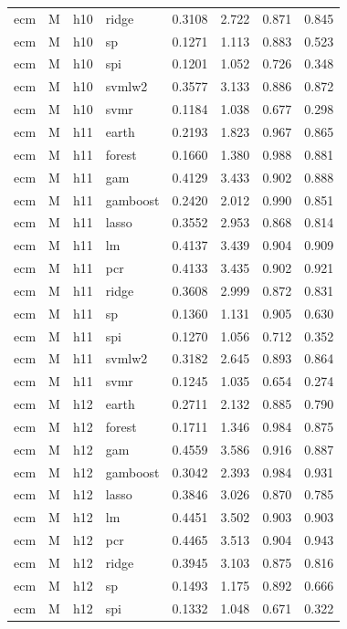 \begin{ThreePartTable}
\begin{longtable}[t]{llclcccc}
ecm & M & h10 & ridge & 0.3108 & 2.722 & 0.871 & 0.845\\
ecm & M & h10 & sp & 0.1271 & 1.113 & 0.883 & 0.523\\
ecm & M & h10 & spi & 0.1201 & 1.052 & 0.726 & 0.348\\
ecm & M & h10 & svmlw2 & 0.3577 & 3.133 & 0.886 & 0.872\\
ecm & M & h10 & svmr & 0.1184 & 1.038 & 0.677 & 0.298\\
\addlinespace
ecm & M & h11 & earth & 0.2193 & 1.823 & 0.967 & 0.865\\
ecm & M & h11 & forest & 0.1660 & 1.380 & 0.988 & 0.881\\
ecm & M & h11 & gam & 0.4129 & 3.433 & 0.902 & 0.888\\
ecm & M & h11 & gamboost & 0.2420 & 2.012 & 0.990 & 0.851\\
ecm & M & h11 & lasso & 0.3552 & 2.953 & 0.868 & 0.814\\
ecm & M & h11 & lm & 0.4137 & 3.439 & 0.904 & 0.909\\
ecm & M & h11 & pcr & 0.4133 & 3.435 & 0.902 & 0.921\\
ecm & M & h11 & ridge & 0.3608 & 2.999 & 0.872 & 0.831\\
ecm & M & h11 & sp & 0.1360 & 1.131 & 0.905 & 0.630\\
ecm & M & h11 & spi & 0.1270 & 1.056 & 0.712 & 0.352\\
ecm & M & h11 & svmlw2 & 0.3182 & 2.645 & 0.893 & 0.864\\
ecm & M & h11 & svmr & 0.1245 & 1.035 & 0.654 & 0.274\\
\addlinespace
ecm & M & h12 & earth & 0.2711 & 2.132 & 0.885 & 0.790\\
ecm & M & h12 & forest & 0.1711 & 1.346 & 0.984 & 0.875\\
ecm & M & h12 & gam & 0.4559 & 3.586 & 0.916 & 0.887\\
ecm & M & h12 & gamboost & 0.3042 & 2.393 & 0.984 & 0.931\\
ecm & M & h12 & lasso & 0.3846 & 3.026 & 0.870 & 0.785\\
ecm & M & h12 & lm & 0.4451 & 3.502 & 0.903 & 0.903\\
ecm & M & h12 & pcr & 0.4465 & 3.513 & 0.904 & 0.943\\
ecm & M & h12 & ridge & 0.3945 & 3.103 & 0.875 & 0.816\\
ecm & M & h12 & sp & 0.1493 & 1.175 & 0.892 & 0.666\\
ecm & M & h12 & spi & 0.1332 & 1.048 & 0.671 & 0.322\\

\end{longtable}
\end{ThreePartTable}
